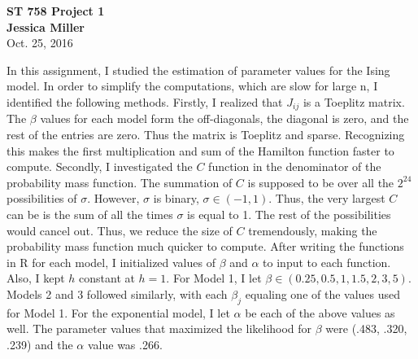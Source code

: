 \documentclass[11pt]{article}
\begin{document}
\begin{center}
	{\Large {\bf ST 758 Project 1}}\\ \vspace{12pt}
	{\large {\bf Jessica Miller}}\\ \vspace{12pt}
	Oct. 25, 2016
	\vspace{5mm}
	\vspace{5mm}
\end{center}

\begin{flushleft}
	In this assignment, I studied the estimation of parameter values for the Ising model. In order to simplify the computations, which are slow for large n, I identified the following methods.
	\newline
	\newline
	Firstly, I realized that \(J_{ij}\) is a Toeplitz matrix. The \(\beta\) values for each model form the off-diagonals, the diagonal is zero, and the rest of the entries are zero. Thus the matrix is Toeplitz and sparse. Recognizing this makes the first multiplication and sum of the Hamilton function faster to compute.
	\newline
	\newline
	Secondly, I investigated the \(C\) function in the denominator of the probability mass function. The summation of \(C\) is supposed to be over all the \(2^{24}\) possibilities of \(\sigma\). However, \(\sigma\) is binary, \(\sigma \in (-1,1) \). Thus, the very largest \(C\) can be is the sum of all the times \(\sigma\) is equal to 1. The rest of the possibilities would cancel out. Thus, we reduce the size of \(C\) tremendously, making the probability mass function much quicker to compute.
	\newline
	\newline
	After writing the functions in R for each model, I initialized values of \(\beta\) and \(\alpha\) to input to each function. Also, I kept \(h\) constant at \(h=1\). For Model 1, I let \(\beta \in (0.25, 0.5, 1, 1.5, 2, 3, 5)\). Models 2 and 3 followed similarly, with each \(\beta_j\) equaling one of the values used for Model 1. For the exponential model, I let \(\alpha\) be each of the above values as well.
	\newline
	\newline
	The parameter values that maximized the likelihood for \(\beta\) were (.483, .320, .239) and the \(\alpha\) value was .266.
\end{flushleft}
\end{document}

